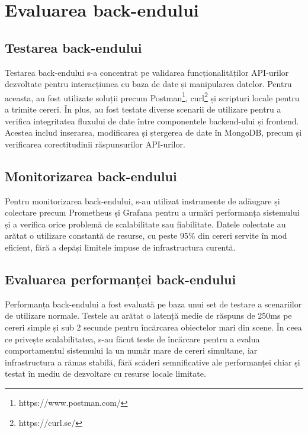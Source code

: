 \section{Evaluarea back-endului}
\label{subsec:evaluare-backend}

\subsection{Testarea back-endului}
\label{subsubsec:evaluare-backend-testare}

Testarea back-endului s-a concentrat pe validarea funcționalităților API-urilor dezvoltate pentru interacțiunea cu baza de date
și manipularea datelor. Pentru aceasta, au fost utilizate soluții precum Postman\footnote{https://www.postman.com/}, curl\footnote{https://curl.se/}
și scripturi locale pentru a trimite cereri. În plus, au fost
testate diverse scenarii de utilizare pentru a verifica integritatea fluxului de date între componentele backend-ului și frontend. Acestea includ
inserarea, modificarea și ștergerea de date în MongoDB, precum și verificarea corectitudinii răspunsurilor API-urilor.

\subsection{Monitorizarea back-endului}
\label{subsubsec:evaluare-backend-monitorizare}

Pentru monitorizarea back-endului, s-au utilizat instrumente de adăugare și colectare precum Prometheus și Grafana pentru a
urmări performanța sistemului și a verifica orice problemă de scalabilitate sau fiabilitate. Datele colectate au arătat o utilizare 
constantă de resurse, cu peste 95\% din cereri servite în mod eficient, fără a depăși limitele impuse de infrastructura curentă.

\subsection{Evaluarea performanței back-endului}
\label{subsubsec:evaluare-backend-performanta}

Performanța back-endului a fost evaluată pe baza unui set de testare a scenariilor de utilizare normale.
Testele au arătat o latență medie de răspuns de 250ms pe cereri simple și sub 2 secunde pentru încărcarea obiectelor mari din scene. În ceea ce
privește scalabilitatea, s-au făcut teste de încărcare pentru a evalua comportamentul sistemului la un număr mare de cereri simultane,
iar infrastructura a rămas stabilă, fără scăderi semnificative ale performanței chiar și testat în mediu de dezvoltare cu resurse locale limitate.

